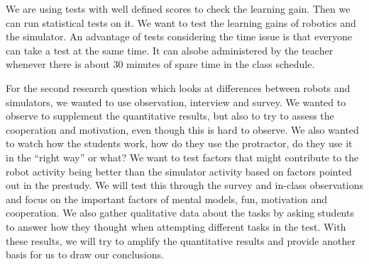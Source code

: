 \bigskip\noindent
We are using tests with well defined scores to check the learning gain. Then we can run statistical tests on it. We want to test the learning gains of robotics and the simulator. An advantage of tests considering the time issue is that everyone can take a test at the same time. It can alsobe administered by the teacher whenever there is about 30 minutes of spare time in the class schedule.

\bigskip\noindent
For the second research question which looks at differences between robots and simulators,  we wanted to use observation, interview and survey. We wanted to observe to supplement the quantitative results, but also to try to assess the cooperation and motivation, even though this is hard to observe. We also wanted to watch how the students work, how do they use the protractor, do they use it in the "`right way"' or what? We want to test factors that might contribute to the robot activity being better than the simulator activity based on factors pointed out in the prestudy. We will test this through the survey and in-class observations and focus on the important factors of mental models, fun, motivation and cooperation. We also gather qualitative data about the tasks by asking students to answer how they thought when attempting different tasks in the test. With these results, we will try to amplify the quantitative results and provide another basis for us to draw our conclusions. 


